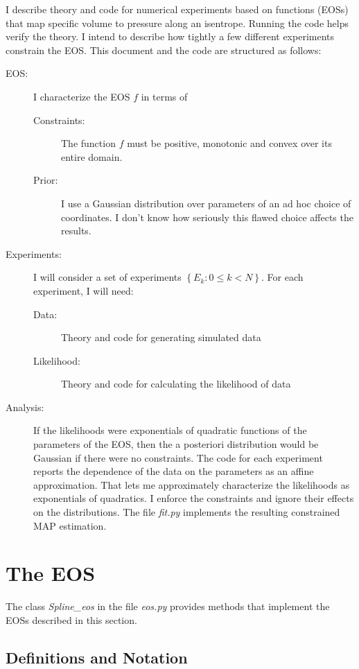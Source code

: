 \documentclass[11pt]{article}
\begin{document}
I describe theory and code for numerical experiments based on functions
(EOSs) that map specific volume to pressure along an isentrope.
Running the code helps verify the theory.  I intend to describe how
tightly a few different experiments constrain the EOS.  This document
and the code are structured as follows:
\begin{description}
\item[EOS:] I characterize the EOS $f$ in terms of
  \begin{description}
  \item[Constraints:] The function $f$ must be positive, monotonic and
    convex over its entire domain.
  \item[Prior:] I use a Gaussian distribution over parameters of an ad
    hoc choice of coordinates.  I don't know how seriously this flawed
    choice affects the results.
  \end{description}
\item[Experiments:] I will consider a set of experiments
  $\left\{ E_k: 0 \leq k < N \right\}$.  For each experiment, I will
  need:
  \begin{description}
  \item[Data:] Theory and code for generating simulated data
  \item[Likelihood:] Theory and code for calculating the likelihood of
    data
  \end{description}
\item[Analysis:] If the likelihoods were exponentials of quadratic
  functions of the parameters of the EOS, then the a posteriori
  distribution would be Gaussian if there were no constraints.  The
  code for each experiment reports the dependence of the data on the
  parameters as an affine approximation.  That lets me approximately
  characterize the likelihoods as exponentials of quadratics.  I
  enforce the constraints and ignore their effects on the
  distributions.  The file \emph{fit.py} implements the resulting
  constrained MAP estimation.
\end{description}

\section{The EOS}
\label{sec:eos}

The class \emph{Spline\_eos} in the file \emph{eos.py} provides
methods that implement the EOSs described in this section.

\subsection{Definitions and Notation}
\label{sec:eos-notation}
\end{document}
